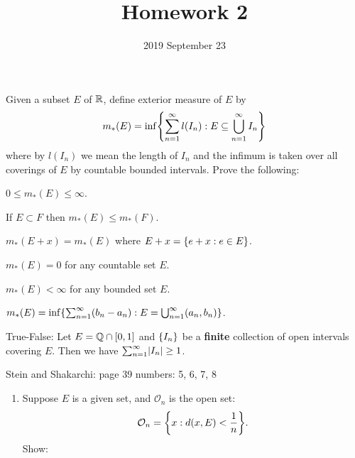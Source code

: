 \documentclass{../homework}
\title{Homework 2}
\author{}
\date{2019 September 23}
\begin{document}
\begin{problems}
\item Given a subset \(E\) of \(\mathbb R\), define exterior measure of
  \(E\) by
  \[
    m_*(E) = \inf\set*{
      \sum_{n=1}^\infty l(I_n)
      : E \subseteq \bigcup_{n=1}^\infty I_n
    }
  \]
  where by \(l(I_n)\) we mean the length of \(I_n\) and the infimum is
  taken over all coverings of \(E\) by countable bounded intervals.
  Prove the following:
  \begin{problems}
  \item \(0 \le m_*(E) \le \infty\).
  \item If \(E \subset F\) then \(m_*(E) \le m_*(F)\).
  \item \(m_*(E+x) = m_*(E)\) where \(E+x = \{e+x : e \in E\}\).
  \item \(m_*(E) = 0\) for any countable set \(E\).
  \item \(m_*(E) < \infty\) for any bounded set \(E\).
  \item
    \(m_*(E) = \inf\set*{\sum_{n=1}^\infty (b_n-a_n) : E =
      \bigcup_{n=1}^\infty (a_n, b_n)}\).
  \end{problems}

  \begin{solution}
    \begin{problems}
    \item
    \item
    \item
    \item
    \item
    \item
    \end{problems}
  \end{solution}

\item True-False: Let \(E = \mathbb Q \cap [0, 1]\) and \(\{I_n\}\) be a
  \textbf{finite} collection of open intervals covering \(E\).  Then
  we have \(\sum_{n=1}^\infty \lvert I_n\rvert \ge 1\).

  \begin{solution}
  \end{solution}

\item Stein and Shakarchi: page 39 numbers: 5, 6, 7, 8

  \begin{book}
    \begin{enumerate}[start=5]
    \item Suppose \(E\) is a given set, and \(\mathcal O_n\) is the
      open set:
      \[
        \mathcal O_n = \set*{x : d(x, E) < \frac 1 n}.
      \]
      Show:
    \end{enumerate}
  \end{book}


\end{problems}
\end{document}
